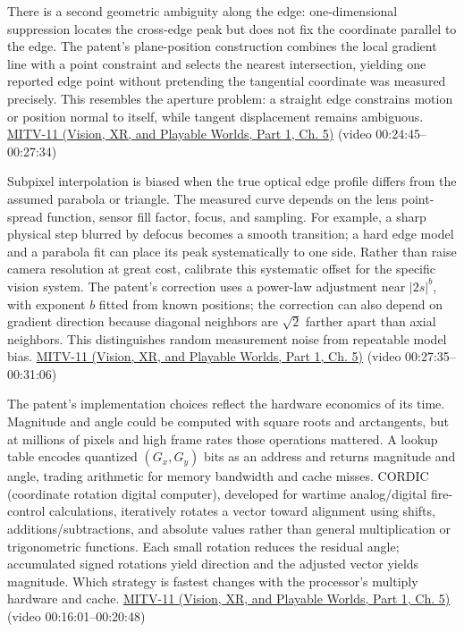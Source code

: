 There is a second geometric ambiguity along the edge: one-dimensional suppression locates the cross-edge peak but does not fix the coordinate parallel to the edge. The patent's plane-position construction combines the local gradient line with a point constraint and selects the nearest intersection, yielding one reported edge point without pretending the tangential coordinate was measured precisely. This resembles the aperture problem: a straight edge constrains motion or position normal to itself, while tangent displacement remains ambiguous. \href{../07-Vision-XR-and-Playable-Worlds-P01/main.pdf\#nameddest=04-visual-computing-ii-ch036-mitv-11---edge-detection-subpixel-position-cordic-line-detection-us-6408109}{MITV-11 (Vision, XR, and Playable Worlds, Part 1, Ch. 5)} (video 00:24:45--00:27:34)

Subpixel interpolation is biased when the true optical edge profile differs from the assumed parabola or triangle. The measured curve depends on the lens point-spread function, sensor fill factor, focus, and sampling. For example, a sharp physical step blurred by defocus becomes a smooth transition; a hard edge model and a parabola fit can place its peak systematically to one side. Rather than raise camera resolution at great cost, calibrate this systematic offset for the specific vision system. The patent's correction uses a power-law adjustment near \(|2s|^b\), with exponent \(b\) fitted from known positions; the correction can also depend on gradient direction because diagonal neighbors are \(\sqrt2\) farther apart than axial neighbors. This distinguishes random measurement noise from repeatable model bias. \href{../07-Vision-XR-and-Playable-Worlds-P01/main.pdf\#nameddest=04-visual-computing-ii-ch036-mitv-11---edge-detection-subpixel-position-cordic-line-detection-us-6408109}{MITV-11 (Vision, XR, and Playable Worlds, Part 1, Ch. 5)} (video 00:27:35--00:31:06)

The patent's implementation choices reflect the hardware economics of its time. Magnitude and angle could be computed with square roots and arctangents, but at millions of pixels and high frame rates those operations mattered. A lookup table encodes quantized \((G_x,G_y)\) bits as an address and returns magnitude and angle, trading arithmetic for memory bandwidth and cache misses. CORDIC (coordinate rotation digital computer), developed for wartime analog/digital fire-control calculations, iteratively rotates a vector toward alignment using shifts, additions/subtractions, and absolute values rather than general multiplication or trigonometric functions. Each small rotation reduces the residual angle; accumulated signed rotations yield direction and the adjusted vector yields magnitude. Which strategy is fastest changes with the processor's multiply hardware and cache. \href{../07-Vision-XR-and-Playable-Worlds-P01/main.pdf\#nameddest=04-visual-computing-ii-ch036-mitv-11---edge-detection-subpixel-position-cordic-line-detection-us-6408109}{MITV-11 (Vision, XR, and Playable Worlds, Part 1, Ch. 5)} (video 00:16:01--00:20:48)

